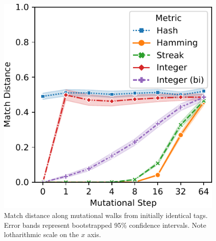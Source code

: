 \begin{figure}[!htbp]
\begin{center}

\includegraphics[width=\textwidth]{img/mutational_walk/bitweight=0dot5+seed=1+title=mutational_walk_lineplot_ci+_data_hathash_hash=8bf152d87daa9cb7+_script_fullcat_hash=44400a7961ad5f3b+ext=}
\caption{
Match distance along mutational walks from initially identical tags.
Error bands represent bootstrapped 95\% confidence intervals.
Note lotharithmic scale on the $x$ axis.
}
\label{fig:mutational_walk_barplot}

\end{center}
\end{figure}
